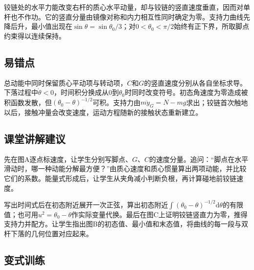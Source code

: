 \documentclass[UTF8,fontset=fandol,a4paper,11pt]{ctexart}
\begin{document}
铰链处的水平力能改变右杆的质心水平动量，却与铰链的竖直速度垂直，因而对单杆也不作功。它的竖直分量由镜像对称和内力相互性同时确定为零。支持力曲线先降后升，最小值出现在$\sin\theta=\sin\theta_0/3$；对$0<\theta_0<\pi/2$始终有正下界，所取脚点约束得以连续保持。



\subsection*{易错点}

总动能中同时保留质心平动项与转动项，$C$和$G$的竖直速度分别从各自坐标求导。下落过程中$\dot\theta<0$，时间积分换成从0到$\theta_0$时同时改变符号。初态角速度为零造成被积函数发散，但$(\theta_0-\theta)^{-1/2}$可积。支持力由$m\ddot y_G=N-mg$求出；铰链首次触地以后，接触冲量会改变速度，运动方程随新的接触状态重新建立。



\subsection*{课堂讲解建议}

先在图A逐点标速度，让学生分别写脚点、$G$、$C$的速度分量。追问：“脚点在水平滑动时，哪一种动能分解最方便？”由质心速度和质心惯量算出两项动能，并比较它们的系数。能量式形成后，让学生从夹角减小判断负根，再计算碰地前铰链速度。

写出时间式后在初态附近展开一次正弦，算出初态附近$\int(\theta_0-\theta)^{-1/2}\mathrm d\theta$的有限值；也可用$u^2=\theta_0-\theta$作实际变量代换。最后在图C上证明铰链竖直力为零，推得支持力并配方。让学生指出图B的初态值、最小值和末态值，将曲线的每一段与双杆下落的几何位置对应起来。



\subsection*{变式训练}
\end{document}
